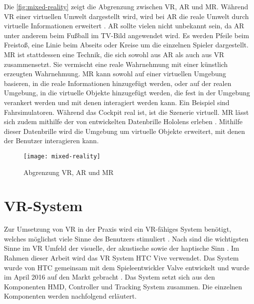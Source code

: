 Die \autoref{fig:mixed-reality} zeigt die Abgrenzung zwischen \ac{VR}, \ac{AR} und \ac{MR}. Während \ac{VR} einer virtuellen Umwelt dargestellt wird, wird bei \ac{AR} die reale Umwelt durch virtuelle Informationen erweitert \cite{Broll.2019}. \ac{AR} sollte vielen nicht unbekannt sein, da \ac{AR} unter anderem beim Fußball im TV-Bild angewendet wird. Es werden Pfeile beim Freistoß, eine Linie beim Abseits oder Kreise um die einzelnen Spieler dargestellt. \cite{Kolletzky.2018} \ac{MR} ist stattdessen eine Technik, die sich sowohl aus \ac{AR} als auch aus \ac{VR} zusammensetzt. Sie vermischt eine reale Wahrnehmung mit einer künstlich erzeugten Wahrnehmung. \ac{MR} kann sowohl auf einer virtuellen Umgebung basieren, in die reale Informationen hinzugefügt werden, oder auf der realen Umgebung, in die virtuelle Objekte hinzugefügt werden, die fest in der Umgebung verankert werden und mit denen interagiert werden kann. Ein Beispiel sind Fahrsimulatoren. Während das Cockpit real ist, ist die Szenerie virtuell. \cite{BurofurTechnikfolgenAbschatzungbeimDeutschenBundestag.2019} \ac{MR} lässt sich zudem mithilfe der von \citeauthor{Microsoft.2020} entwickelten Datenbrille Hololens erleben \cite{Microsoft.2020}. Mithilfe dieser Datenbrille wird die Umgebung um virtuelle Objekte erweitert, mit denen der Benutzer interagieren kann. 

\begin{figure}[!htbp]
	\centering
	\texttt{[image: mixed-reality]}
	\caption[Abgrenzung VR, AR und MR]{Abgrenzung VR, AR und MR \cite[S. 20]{BurofurTechnikfolgenAbschatzungbeimDeutschenBundestag.2019}}
	\label{fig:mixed-reality}
\end{figure}

\section{\acs{VR}-System}
Zur Umsetzung von \ac{VR} in der Praxis wird ein \ac{VR}-fähiges System benötigt, welches möglichst viele Sinne des Benutzers stimuliert \cite{Doerner2019}. Nach \citeauthor{DoernerWahrnehmung} sind die wichtigsten Sinne im \ac{VR} Umfeld der visuelle, der akustische sowie der haptische Sinn \cite{DoernerWahrnehmung}. Im Rahmen dieser Arbeit wird das \acs{VR} System HTC Vive verwendet. Das System wurde von HTC gemeinsam mit dem Spieleentwickler Valve entwickelt und wurde im April 2016 auf den Markt gebracht \cite{Fehrenbach.14.4.2016}. Das System setzt sich aus den Komponenten \ac{HMD}, Controller und Tracking System zusammen. Die einzelnen Komponenten werden nachfolgend erläutert. 

